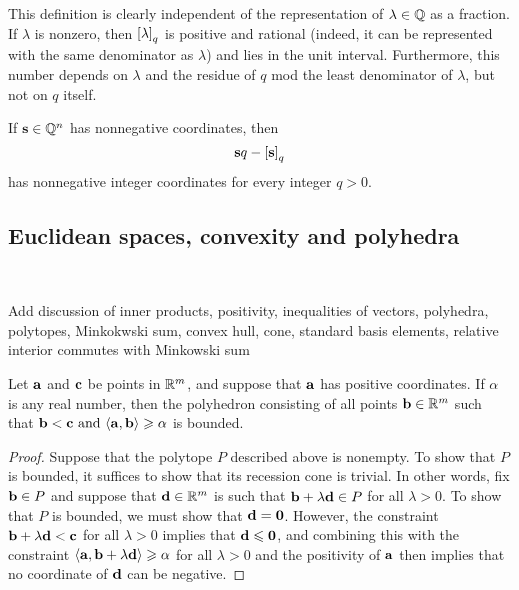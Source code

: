 \documentclass[11pt]{amsart}
\renewcommand{\!}[1]{{\color{red}\text{$\star$\,}#1\,$\star$}}
\begin{document}
This definition is clearly independent of the representation of $\lambda \in \mathbb{Q}$ as a fraction.  If $\lambda$ is nonzero, then $\left[ \lambda \right]_q$ is positive and rational (indeed, it can be represented with the same denominator as $\lambda$) and lies in the unit interval.  Furthermore, this number depends on $\lambda$ and the residue of $q$ mod the least denominator of $\lambda$, but not on $q$ itself.

\begin{remark}  If $\mathbf{s} \in \mathbb{Q}^n$ has nonnegative coordinates, then \[ \mathbf{s}q - \left[ \mathbf{s} \right]_q \] has nonnegative integer coordinates for every integer $q>0$.
\end{remark}


\subsection{Euclidean spaces, convexity and polyhedra} 
\ 


 \alert[inline]{Add discussion of inner products, positivity, inequalities of vectors, polyhedra, polytopes, Minkokwski sum, convex hull, cone, standard basis elements, relative interior commutes with Minkowski sum}


\begin{lemma}  
\label{bounded polytope: L}
Let $\mathbf{a}$ and $\mathbf{c}$ be points in $\mathbb{R}^m$, and suppose that $\mathbf{a}$ has positive coordinates.    If $\alpha$ is any real number, then the polyhedron consisting of all points $\mathbf{b} \in \mathbb{R}^m$ such that  $\mathbf{b} < \mathbf{c} \text{ and } \langle \mathbf{a}, \mathbf{b} \rangle \geqslant \alpha$ is bounded.
\end{lemma}

\begin{proof}  Suppose that the polytope $P$ described above is nonempty.   To show that $P$ is bounded, it suffices to show that its recession cone is trivial.  In other words, fix $\mathbf{b} \in P$ and suppose that $\mathbf{d} \in \mathbb{R}^m$ is such that $\mathbf{b} + \lambda \mathbf{d} \in P$ for all $\lambda > 0$.  To show that $P$ is bounded, we must show that $\mathbf{d} = \mathbf{0}$.   However,  the constraint $\mathbf{b} + \lambda \mathbf{d} < \mathbf{c}$ for all $\lambda>0$ implies that $\mathbf{d} \leqslant \mathbf{0}$, and combining this with the constraint $\langle \mathbf{a}, \mathbf{b} + \lambda \mathbf{d} \rangle \geqslant \alpha$ for all $\lambda > 0$ and the positivity of $\mathbf{a}$ then implies that no coordinate of $\mathbf{d}$ can be negative.
\end{proof}
\end{document}
